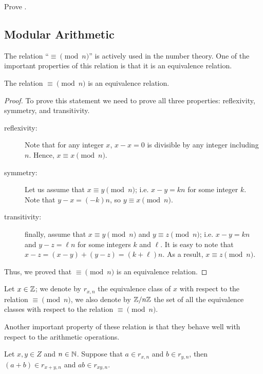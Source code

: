 \begin{exercise}
  Prove .
\end{exercise}

\subsection{Modular Arithmetic}
The relation ``$\equiv \pmod{n}$'' is actively used in the number theory. One
of the important properties of this relation is that it is an equivalence
relation.
\begin{theorem}
  The relation $\equiv \pmod{n}$ is an equivalence relation.
\end{theorem}
\begin{proof}
  To prove this statement we need to prove all three properties: reflexivity,
  symmetry, and transitivity.
  \begin{description}
    \item[reflexivity:] Note that for any integer $x$, $x - x = 0$ is divisible
      by any integer including $n$. Hence, $x \equiv x \pmod{n}$.
    \item[symmetry:] Let us assume that $x \equiv y \pmod{n}$; i.e. $x - y = kn$
      for some integer $k$. Note that $y - x = (-k) n$, so
      $y \equiv x \pmod{n}$.
    \item[transitivity:] finally, assume that $x \equiv y \pmod{n}$ and
      $y \equiv z \pmod{n}$; i.e. $x - y = k n$ and $y - z = \ell n$
      for some integers $k$ and $\ell$. It is easy to note that
      $x - z = (x - y) + (y - z) = (k + \ell) n$. As a result,
      $x \equiv z \pmod{n}$.
  \end{description}
  Thus, we proved that $\equiv \pmod{n}$ is an equivalence relation.
\end{proof}

Let $x \in \mathbb{Z}$; we denote by $r_{x, n}$ the equivalence class of $x$ with
respect to the relation $\equiv \pmod{n}$, we also denote by $\mathbb{Z} / n\mathbb{Z}$ the set
of all the equivalence classes with respect to the relation $\equiv \pmod{n}$.

Another important property of these relation is that they behave well with
respect to the arithmetic operations.
\begin{theorem}
  Let $x, y \in Z$ and $n \in \mathbb{N}$. Suppose that $a \in r_{x, n}$ and $b \in
  r_{y, n}$, then $(a + b) \in r_{x + y, n}$ and $ab \in r_{xy, n}$.
\end{theorem}

